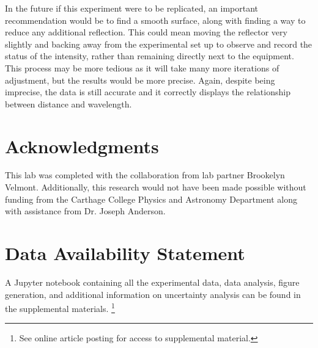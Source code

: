 \documentclass[rc]{physicsinprogress}
\begin{document}
    In the future if this experiment were to be replicated, an important recommendation would be to find a smooth surface, along with finding a way to reduce any additional reflection. This could mean moving the reflector very slightly and backing away from the experimental set up to observe and record the status of the intensity, rather than remaining directly next to the equipment. This process may be more tedious as it will take many more iterations of adjustment, but the results would be more precise. Again, despite being imprecise, the data is still accurate and it correctly displays the relationship between distance and wavelength.


\section{Acknowledgments}
     This lab was completed with the collaboration from lab partner Brookelyn Velmont. Additionally, this research would not have been made possible without funding from the Carthage College Physics and Astronomy Department along with assistance from Dr. Joseph Anderson.

\section*{Data Availability Statement}
A Jupyter notebook containing all the experimental data, data analysis, figure generation, and additional information on uncertainty analysis can be found in the supplemental materials. \footnote{See online article posting for access to supplemental material.}


%

\end{document}
